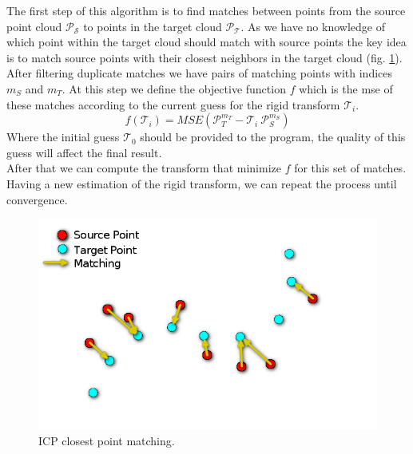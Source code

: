 The first step of this algorithm is to find matches between points from the source point cloud $\mathcal{P_S}$ to points in the target cloud $\mathcal{P_T}$. As we have no knowledge of which point within the target cloud should match with source points the key idea is to match source points with their closest neighbors in the target cloud (fig. \ref{fig:closest_point}). After filtering duplicate matches we have pairs of matching points with indices $m_S$ and $m_T$. At this step we define the objective function $f$ which is the \acrshort{mse} of these matches according to the current guess for the rigid transform $\mathcal{T}_{i}$. \\
\[
    f(\mathcal{T}_i) = MSE(\mathcal{P}_T^{m_T} - \mathcal{T}_i\: \mathcal{P}_S^{m_S})
\]
Where the initial guess $\mathcal{T}_0$ should be provided to the program, the quality of this guess will affect the final result. \\
After that we can compute the transform that minimize $f$ for this set of matches. Having a new estimation of the rigid transform, we can repeat the process until convergence. 

\begin{figure}[h!]
    \centering
    \includegraphics[width=\textwidth]{images/closest_point.png}
    \caption{ICP closest point matching.}
    \label{fig:closest_point}
\end{figure}


